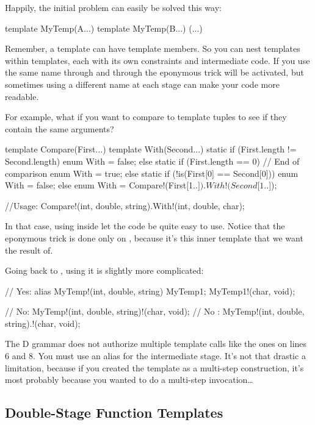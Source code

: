 Happily, the initial problem can easily be solved this way:

\begin{dcode}
template MyTemp(A...)
{
    template MyTemp(B...)
    {
    (...)
    }
}
\end{dcode}

Remember, a template can have template members. So you can nest templates within templates, each with its own constraints and intermediate code. If you use the same name through and through the eponymous trick will be activated, but sometimes using a different name at each stage can make your code more readable.

For example, what if you want to compare to template tuples to see if they contain the same arguments?

\begin{dcode}
template Compare(First...)
{
    template With(Second...)
    {
        static if (First.length != Second.length)
            enum With = false;
        else static if (First.length == 0) // End of comparison
            enum With = true;
        else static if (!is(First[0] == Second[0]))
            enum With = false;
        else
            enum With = Compare!(First[1..$]).With!(Second[1..$]);
    }
}

//Usage:
Compare!(int, double, string).With!(int, double, char);
\end{dcode}

In that case, using  inside  let the code be quite easy to use. Notice that the eponymous trick is done only on , because it's this inner template that we want the result of.

Going back to , using it is slightly more complicated:

\begin{ndcode}
// Yes:
alias MyTemp!(int, double, string) MyTemp1;
MyTemp1!(char, void);

// No:
MyTemp!(int, double, string)!(char, void);
// No :
MyTemp!(int, double, string).!(char, void);
\end{ndcode}

The D grammar does not authorize multiple template calls like the ones on lines 6 and 8. You must use an alias for the intermediate stage. It's not that drastic a limitation, because if you created the template as a multi-step construction, it's most probably because you wanted to do a multi-step invocation\ldots

\subsection{Double-Stage Function Templates}

